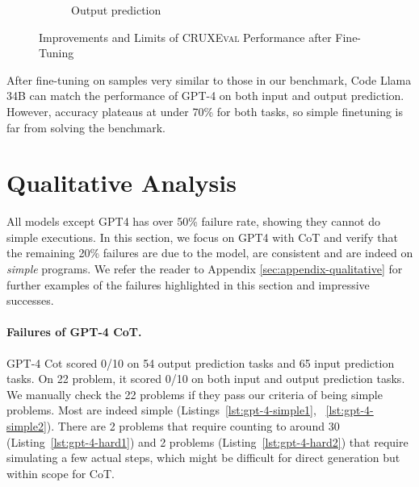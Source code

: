 \documentclass{article}
\newcommand{\benchmark}{\textsc{CRUXEval}\xspace}
\begin{document}
\begin{figure}[H]
\begin{subfigure}[b]{0.48\textwidth}
         \caption{Output prediction}
         \label{fig:finetuning-accuracy-samples-plot-output-main}
     \end{subfigure}
     \caption{Improvements and Limits of \benchmark Performance after Fine-Tuning}
     \label{fig:finetuning-accuracy-samples-plot-main}
\end{figure}

\begin{tcolorbox}[colback=lightgreen, boxrule=0pt, arc=10pt, outer arc=10pt]
After fine-tuning on samples very similar to those in our benchmark, Code Llama 34B can match the performance of GPT-4 on both input and output prediction. However, accuracy plateaus at under 70\% for both tasks, so simple finetuning is far from solving the benchmark.
\end{tcolorbox}

\section{Qualitative Analysis} \label{sec:qualitative-analysis}
All models except GPT4 has over 50\% failure rate, showing they cannot do simple executions. 
In this section, we focus on GPT4 with CoT and verify that the remaining 20\% failures are due to the model, are consistent and are indeed on \emph{simple} programs. We refer the reader to Appendix \ref{sec:appendix-qualitative} for further examples of the failures highlighted in this section and impressive successes.

\paragraph{Failures of GPT-4 CoT.}
GPT-4 Cot scored 0/10 on 54 output prediction tasks and 65 input prediction tasks. On 22 problem, it scored 0/10 on both input and output prediction tasks. 
We manually check the 22 problems if they pass our criteria of being simple problems. Most are indeed simple (Listings~\ref{lst:gpt-4-simple1}, ~\ref{lst:gpt-4-simple2}). There are 2 problems that require counting to around 30 (Listing~\ref{lst:gpt-4-hard1}) and 2 problems (Listing~\ref{lst:gpt-4-hard2}) that require simulating a few actual steps, which might be difficult for direct generation but within scope for CoT. 
\end{document}
